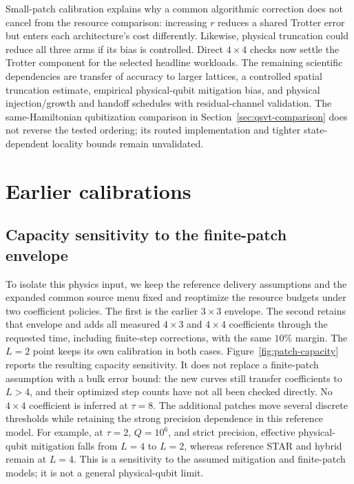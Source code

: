\documentclass[11pt]{article}
\begin{document}
Small-patch calibration explains why a common algorithmic correction does
not cancel from the resource comparison: increasing $r$ reduces a shared
Trotter error but enters each architecture's cost differently. Likewise,
physical truncation could reduce all three arms if its bias is controlled.
Direct $4\times4$ checks now settle the Trotter component for the selected
headline workloads. The remaining scientific dependencies are transfer of
accuracy to larger lattices, a controlled spatial truncation estimate,
empirical physical-qubit mitigation bias, and physical injection/growth and
handoff schedules with residual-channel validation. The same-Hamiltonian
qubitization comparison in Section~\ref{sec:qsvt-comparison} does not
reverse the tested ordering; its routed implementation and tighter
state-dependent locality bounds remain unvalidated.



\section{Earlier calibrations}\label{sup:calibration}
\subsection{Capacity sensitivity to the finite-patch envelope}
To isolate this physics input, we keep the reference delivery assumptions
and the expanded common source menu fixed and reoptimize the resource
budgets under two coefficient policies. The first is the earlier
$3\times3$ envelope. The second retains that envelope and adds all
measured $4\times3$ and $4\times4$ coefficients through the requested
time, including finite-step corrections, with the same $10\%$ margin.
The $L=2$ point keeps its own calibration in both cases.
Figure~\ref{fig:patch-capacity} reports the resulting capacity sensitivity.
It does not replace a finite-patch assumption with a bulk error bound:
the new curves still transfer coefficients to $L>4$, and their optimized
step counts have not all been checked directly. No $4\times4$ coefficient
is inferred at $\tau=8$.
The additional patches move several discrete thresholds while retaining
the strong precision dependence in this reference model. For example,
at $\tau=2$, $Q=10^6$, and strict precision, effective physical-qubit mitigation falls from
$L=4$ to $L=2$, whereas reference STAR and hybrid remain at $L=4$.
This is a sensitivity to the assumed mitigation and finite-patch models;
it is not a general physical-qubit limit.
\end{document}
